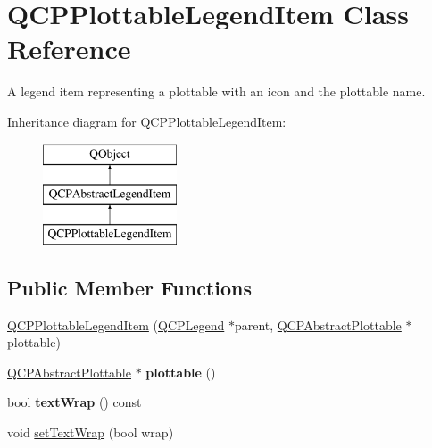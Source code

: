 \hypertarget{classQCPPlottableLegendItem}{\section{Q\-C\-P\-Plottable\-Legend\-Item Class Reference}
\label{classQCPPlottableLegendItem}
}


A legend item representing a plottable with an icon and the plottable name.  


Inheritance diagram for Q\-C\-P\-Plottable\-Legend\-Item\-:\begin{figure}[H]
\begin{center}
\leavevmode
\includegraphics[height=3.000000cm]{classQCPPlottableLegendItem}
\end{center}
\end{figure}
\subsection*{Public Member Functions}
\begin{DoxyCompactItemize}
\item 
\hyperlink{classQCPPlottableLegendItem_ac1072591fe409d3dabad51b23ee4d6c5}{Q\-C\-P\-Plottable\-Legend\-Item} (\hyperlink{classQCPLegend}{Q\-C\-P\-Legend} $\ast$parent, \hyperlink{classQCPAbstractPlottable}{Q\-C\-P\-Abstract\-Plottable} $\ast$plottable)
\item 
\hypertarget{classQCPPlottableLegendItem_af29e9a2c60b4cba0cac2447b8af7b488}{\hyperlink{classQCPAbstractPlottable}{Q\-C\-P\-Abstract\-Plottable} $\ast$ {\bfseries plottable} ()}\label{classQCPPlottableLegendItem_af29e9a2c60b4cba0cac2447b8af7b488}

\item 
\hypertarget{classQCPPlottableLegendItem_a93d3d9ccfa537ff9935eef649ff52ebe}{bool {\bfseries text\-Wrap} () const }\label{classQCPPlottableLegendItem_a93d3d9ccfa537ff9935eef649ff52ebe}

\item 
void \hyperlink{classQCPPlottableLegendItem_ad5155ff022427947dc5c015cbf8e28b7}{set\-Text\-Wrap} (bool wrap)
\end{DoxyCompactItemize}
